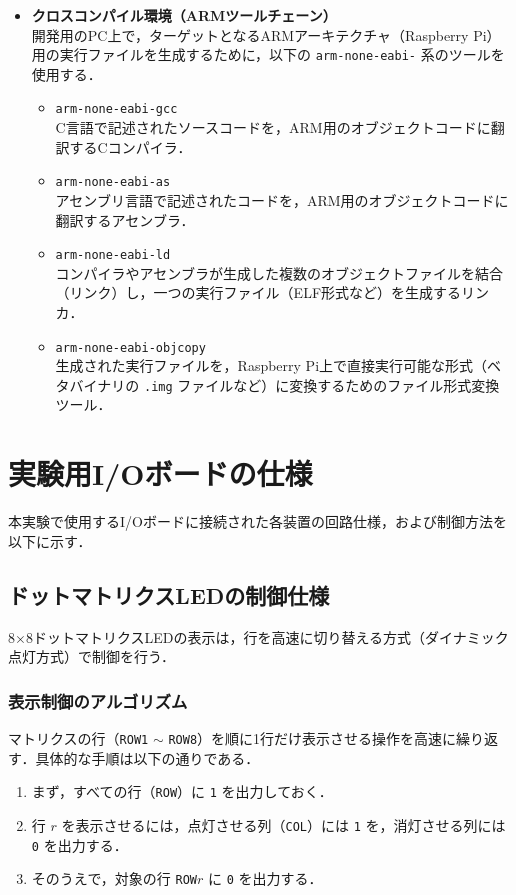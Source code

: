 \documentclass{jlreq}
\begin{document}
  \begin{itemize}
      \item \textbf{クロスコンパイル環境（ARMツールチェーン）} \\
      開発用のPC上で，ターゲットとなるARMアーキテクチャ（Raspberry Pi）用の実行ファイルを生成するために，以下の \texttt{arm-none-eabi-} 系のツールを使用する．
      \begin{itemize}
          \item \texttt{arm-none-eabi-gcc} \\
          C言語で記述されたソースコードを，ARM用のオブジェクトコードに翻訳するCコンパイラ．
          \item \texttt{arm-none-eabi-as} \\
          アセンブリ言語で記述されたコードを，ARM用のオブジェクトコードに翻訳するアセンブラ．
          \item \texttt{arm-none-eabi-ld} \\
          コンパイラやアセンブラが生成した複数のオブジェクトファイルを結合（リンク）し，一つの実行ファイル（ELF形式など）を生成するリンカ．
          \item \texttt{arm-none-eabi-objcopy} \\
          生成された実行ファイルを，Raspberry Pi上で直接実行可能な形式（ベタバイナリの \texttt{.img} ファイルなど）に変換するためのファイル形式変換ツール．
      \end{itemize}
  \end{itemize}

  \section{実験用I/Oボードの仕様}
  本実験で使用するI/Oボードに接続された各装置の回路仕様，および制御方法を以下に示す．

  \subsection{ドットマトリクスLEDの制御仕様}
  8$\times$8ドットマトリクスLEDの表示は，行を高速に切り替える方式（ダイナミック点灯方式）で制御を行う．

  \subsubsection{表示制御のアルゴリズム}
  マトリクスの行（\texttt{ROW1} $\sim$ \texttt{ROW8}）を順に1行だけ表示させる操作を高速に繰り返す．具体的な手順は以下の通りである．
  \begin{enumerate}
      \item まず，すべての行（\texttt{ROW}）に \texttt{1} を出力しておく．
      \item 行 $r$ を表示させるには，点灯させる列（\texttt{COL}）には \texttt{1} を，消灯させる列には \texttt{0} を出力する．
      \item そのうえで，対象の行 \texttt{ROW}$r$ に \texttt{0} を出力する．
  \end{enumerate}
\end{document}
